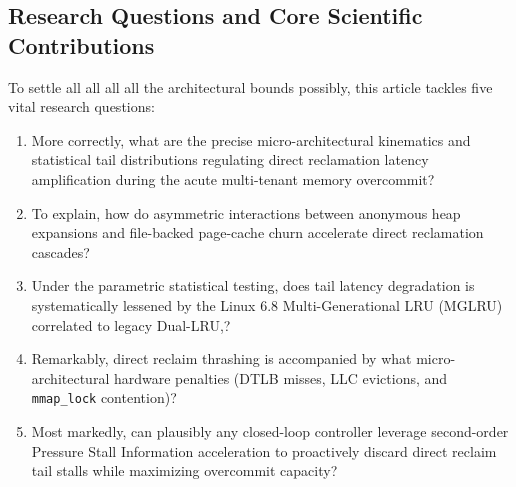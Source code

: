 \documentclass[pdflatex,sn-mathphys,Numbered]{sn-jnl}
\begin{document}
\subsection{Research Questions and Core Scientific Contributions}
To settle all all all all the architectural bounds possibly, this article tackles five vital research questions:
\begin{enumerate}
    \item[\textbf{RQ1:}] More correctly, what are the precise micro-architectural kinematics and statistical tail distributions regulating direct reclamation latency amplification during the acute multi-tenant memory overcommit?
    \item[\textbf{RQ2:}] To explain, how do asymmetric interactions between anonymous heap expansions and file-backed page-cache churn accelerate direct reclamation cascades?
    \item[\textbf{RQ3:}] Under the parametric statistical testing, does tail latency degradation is systematically lessened by the Linux 6.8 Multi-Generational LRU (MGLRU) correlated to legacy Dual-LRU,?
    \item[\textbf{RQ4:}] Remarkably, direct reclaim thrashing is accompanied by what micro-architectural hardware penalties (DTLB misses, LLC evictions, and \texttt{mmap\_lock} contention)?
    \item[\textbf{RQ5:}] Most markedly, can plausibly any closed-loop controller leverage second-order Pressure Stall Information acceleration to proactively discard direct reclaim tail stalls while maximizing overcommit capacity?
\end{enumerate}
\end{document}
